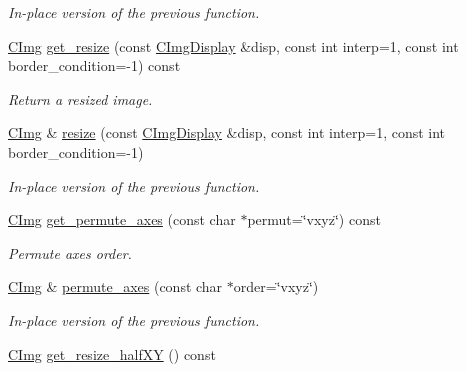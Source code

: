 \begin{DoxyCompactItemize}
\begin{DoxyCompactList}\small\item\em In-\/place version of the previous function. \end{DoxyCompactList}\item 
\hyperlink{structcimg__library_1_1_c_img}{C\-Img} \hyperlink{structcimg__library_1_1_c_img_ab86100a5d3d4d50d1dcc2b9ef7ecfa1b}{get\-\_\-resize} (const \hyperlink{structcimg__library_1_1_c_img_display}{C\-Img\-Display} \&disp, const int interp=1, const int border\-\_\-condition=-\/1) const 
\begin{DoxyCompactList}\small\item\em Return a resized image. \end{DoxyCompactList}\item 
\hypertarget{structcimg__library_1_1_c_img_a97fc47cd0f75974d283a1440992cee1d}{\hyperlink{structcimg__library_1_1_c_img}{C\-Img} \& \hyperlink{structcimg__library_1_1_c_img_a97fc47cd0f75974d283a1440992cee1d}{resize} (const \hyperlink{structcimg__library_1_1_c_img_display}{C\-Img\-Display} \&disp, const int interp=1, const int border\-\_\-condition=-\/1)}\label{structcimg__library_1_1_c_img_a97fc47cd0f75974d283a1440992cee1d}

\begin{DoxyCompactList}\small\item\em In-\/place version of the previous function. \end{DoxyCompactList}\item 
\hyperlink{structcimg__library_1_1_c_img}{C\-Img} \hyperlink{structcimg__library_1_1_c_img_a3fe495de66327a6c9ae822dc0fb05508}{get\-\_\-permute\-\_\-axes} (const char $\ast$permut=\char`\"{}vxyz\char`\"{}) const 
\begin{DoxyCompactList}\small\item\em Permute axes order. \end{DoxyCompactList}\item 
\hypertarget{structcimg__library_1_1_c_img_aec4879624da69845ca1907fc4464e006}{\hyperlink{structcimg__library_1_1_c_img}{C\-Img} \& \hyperlink{structcimg__library_1_1_c_img_aec4879624da69845ca1907fc4464e006}{permute\-\_\-axes} (const char $\ast$order=\char`\"{}vxyz\char`\"{})}\label{structcimg__library_1_1_c_img_aec4879624da69845ca1907fc4464e006}

\begin{DoxyCompactList}\small\item\em In-\/place version of the previous function. \end{DoxyCompactList}\item 
\hypertarget{structcimg__library_1_1_c_img_ad8a8546f8ec3a38d580e212797841c49}{\hyperlink{structcimg__library_1_1_c_img}{C\-Img} \hyperlink{structcimg__library_1_1_c_img_ad8a8546f8ec3a38d580e212797841c49}{get\-\_\-resize\-\_\-half\-X\-Y} () const }\label{structcimg__library_1_1_c_img_ad8a8546f8ec3a38d580e212797841c49}


\end{DoxyCompactItemize}
